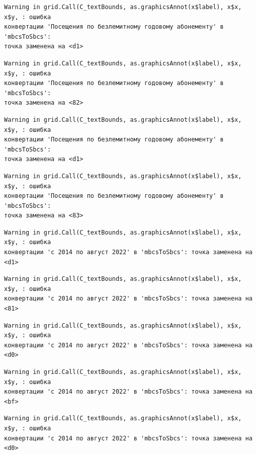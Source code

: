 \documentclass[
  letterpaper,
  DIV=11,
  numbers=noendperiod]{scrreprt}
\begin{document}
\begin{verbatim}
Warning in grid.Call(C_textBounds, as.graphicsAnnot(x$label), x$x, x$y, : ошибка
конвертации 'Посещения по безлемитному годовому абонементу' в 'mbcsToSbcs':
точка заменена на <d1>
\end{verbatim}

\begin{verbatim}
Warning in grid.Call(C_textBounds, as.graphicsAnnot(x$label), x$x, x$y, : ошибка
конвертации 'Посещения по безлемитному годовому абонементу' в 'mbcsToSbcs':
точка заменена на <82>
\end{verbatim}

\begin{verbatim}
Warning in grid.Call(C_textBounds, as.graphicsAnnot(x$label), x$x, x$y, : ошибка
конвертации 'Посещения по безлемитному годовому абонементу' в 'mbcsToSbcs':
точка заменена на <d1>
\end{verbatim}

\begin{verbatim}
Warning in grid.Call(C_textBounds, as.graphicsAnnot(x$label), x$x, x$y, : ошибка
конвертации 'Посещения по безлемитному годовому абонементу' в 'mbcsToSbcs':
точка заменена на <83>
\end{verbatim}

\begin{verbatim}
Warning in grid.Call(C_textBounds, as.graphicsAnnot(x$label), x$x, x$y, : ошибка
конвертации 'с 2014 по август 2022' в 'mbcsToSbcs': точка заменена на <d1>
\end{verbatim}

\begin{verbatim}
Warning in grid.Call(C_textBounds, as.graphicsAnnot(x$label), x$x, x$y, : ошибка
конвертации 'с 2014 по август 2022' в 'mbcsToSbcs': точка заменена на <81>
\end{verbatim}

\begin{verbatim}
Warning in grid.Call(C_textBounds, as.graphicsAnnot(x$label), x$x, x$y, : ошибка
конвертации 'с 2014 по август 2022' в 'mbcsToSbcs': точка заменена на <d0>
\end{verbatim}

\begin{verbatim}
Warning in grid.Call(C_textBounds, as.graphicsAnnot(x$label), x$x, x$y, : ошибка
конвертации 'с 2014 по август 2022' в 'mbcsToSbcs': точка заменена на <bf>
\end{verbatim}

\begin{verbatim}
Warning in grid.Call(C_textBounds, as.graphicsAnnot(x$label), x$x, x$y, : ошибка
конвертации 'с 2014 по август 2022' в 'mbcsToSbcs': точка заменена на <d0>
\end{verbatim}
\end{document}
